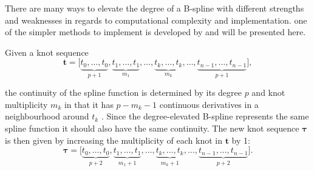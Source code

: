 There are many ways to elevate the degree of a B-spline \citep{piegl1994,Prautzsch1984,lee2000degree} with different strengths and weaknesses in regards to computational complexity and implementation. one of the simpler methods to implement is developed by \cite{Cohen1986} and will be presented here.

Given a knot sequence
\begin{equation}
    \mathbf t = \big[\underbrace{t_0, \ldots, t_0}_{p+1}, \underbrace{t_1, \ldots, t_1}_{m_1}, \ldots, \underbrace{t_k, \ldots, t_k}_{m_k}, \ldots, \underbrace{t_{n-1}, \ldots, t_{n-1}}_{p+1}\big],
\end{equation}

the continuity of the spline function is determined by its degree $p$ and knot multiplicity $m_k$ in that it has $p-m_k-1$ continuous derivatives in a neighbourhood around $t_k$ \citep{Cohen1986}.
Since the degree-elevated B-spline represents the same spline function it should also have the same continuity. The new knot sequence $\boldsymbol \tau$ is then given by increasing the multiplicity of each knot in $\mathbf t$ by 1:
\begin{equation}\label{eq:degree-elevation-knots}
    \boldsymbol \tau = \big[\underbrace{t_0, \ldots, t_0}_{p+2}, \underbrace{t_1, \ldots, t_1}_{m_1+1}, \ldots, \underbrace{t_k, \ldots, t_k}_{m_k+1}, \ldots, \underbrace{t_{n-1}, \ldots, t_{n-1}}_{p+2}\big].
\end{equation}


